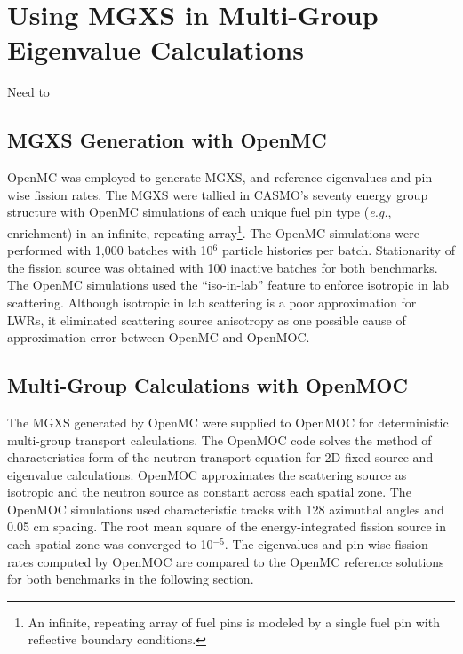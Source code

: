 \section{Using MGXS in Multi-Group Eigenvalue Calculations}
\label{sec:evaluation}

Need to 

\subsection{MGXS Generation with OpenMC}
\label{subsec:openmc}

OpenMC was employed to generate MGXS, and reference eigenvalues and pin-wise fission rates. The MGXS were tallied in CASMO's seventy energy group structure \cite{rhodes2006casmo} with OpenMC simulations of each unique fuel pin type (\textit{e.g.}, enrichment) in an infinite, repeating array\footnote{An infinite, repeating array of fuel pins is modeled by a single fuel pin with reflective boundary conditions.}. The OpenMC simulations were performed with 1,000 batches with 10$^{6}$ particle histories per batch. Stationarity of the fission source was obtained with 100 inactive batches for both benchmarks. The OpenMC simulations used the ``iso-in-lab'' feature to enforce isotropic in lab scattering. Although isotropic in lab scattering is a poor approximation for LWRs, it eliminated scattering source anisotropy as one possible cause of approximation error between OpenMC and OpenMOC.


\subsection{Multi-Group Calculations with OpenMOC}
\label{subsec:openmoc}

The MGXS generated by OpenMC were supplied to OpenMOC \cite{boyd2014openmoc} for deterministic multi-group transport calculations. The OpenMOC code solves the method of characteristics form of the neutron transport equation for 2D fixed source and eigenvalue calculations. OpenMOC approximates the scattering source as isotropic and the neutron source as constant across each spatial zone. The OpenMOC simulations used characteristic tracks with 128 azimuthal angles and 0.05 cm spacing. The root mean square of the energy-integrated fission source in each spatial zone was converged to 10$^{-5}$. The eigenvalues and pin-wise fission rates computed by OpenMOC are compared to the OpenMC reference solutions for both benchmarks in the following section.



